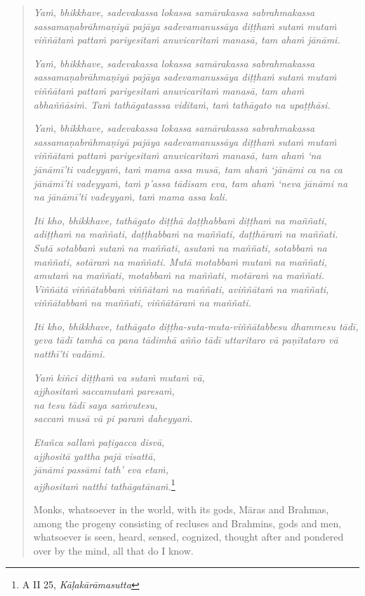\begin{quote}
\emph{Yaṁ, bhikkhave, sadevakassa lokassa samārakassa sabrahmakassa sassamaṇabrāhmaṇiyā pajāya sadevamanussāya diṭṭhaṁ sutaṁ mutaṁ viññātaṁ pattaṁ pariyesitaṁ anuvicaritaṁ manasā, tam ahaṁ jānāmi.}

\emph{Yaṁ, bhikkhave, sadevakassa lokassa samārakassa sabrahmakassa sassamaṇabrāhmaṇiyā pajāya sadevamanussāya diṭṭhaṁ sutaṁ mutaṁ viññātaṁ pattaṁ pariyesitaṁ anuvicaritaṁ manasā, tam ahaṁ abhaññāsiṁ. Taṁ tathāgatasssa viditaṁ, taṁ tathāgato na upaṭṭhāsi.}

\emph{Yaṁ, bhikkhave, sadevakassa lokassa samārakassa sabrahmakassa sassamaṇabrāhmaṇiyā pajāya sadevamanussāya diṭṭhaṁ sutaṁ mutaṁ viññātaṁ pattaṁ pariyesitaṁ anuvicaritaṁ manasā, tam ahaṁ `na jānāmī'ti vadeyyaṁ, taṁ mama assa musā, tam ahaṁ `jānāmi ca na ca jānāmī'ti vadeyyaṁ, taṁ p'assa tādisam eva, tam ahaṁ `neva jānāmi na na jānāmī'ti vadeyyaṁ, taṁ mama assa kali.}

\emph{Iti kho, bhikkhave, tathāgato diṭṭhā daṭṭhabbaṁ diṭṭhaṁ na maññati, adiṭṭhaṁ na maññati, daṭṭhabbaṁ na maññati, daṭṭhāraṁ na maññati. Sutā sotabbaṁ sutaṁ na maññati, asutaṁ na maññati, sotabbaṁ na maññati, sotāraṁ na maññati. Mutā motabbaṁ mutaṁ na maññati, amutaṁ na maññati, motabbaṁ na maññati, motāraṁ na maññati. Viññātā viññātabbaṁ viññātaṁ na maññati, aviññātaṁ na maññati, viññātabbaṁ na maññati, viññātāraṁ na maññati.}

\emph{Iti kho, bhikkhave, tathāgato diṭṭha-suta-muta-viññātabbesu dhammesu tādī, yeva tādī tamhā ca pana tādimhā añño tādī uttaritaro vā paṇītataro vā natthī'ti vadāmi.}

\enlargethispage{\baselineskip}

\emph{Yaṁ kiñci diṭṭhaṁ va sutaṁ mutaṁ vā,}\\
\emph{ajjhositaṁ saccamutaṁ paresaṁ,}\\
\emph{na tesu tādī saya saṁvutesu,}\\
\emph{saccaṁ musā vā pi paraṁ daheyyaṁ.}

\emph{Etañca sallaṁ paṭigacca disvā,}\\
\emph{ajjhositā yattha pajā visattā,}\\
\emph{jānāmi passāmi tath' eva etaṁ,}\\
\emph{ajjhositaṁ natthi tathāgatānaṁ.}\footnote{A II 25, \emph{Kāḷakārāmasutta}}

Monks, whatsoever in the world, with its gods, Māras and Brahmas, among the progeny consisting of recluses and Brahmins, gods and men, whatsoever is seen, heard, sensed, cognized, thought after and pondered over by the mind, all that do I know.


\end{quote}
